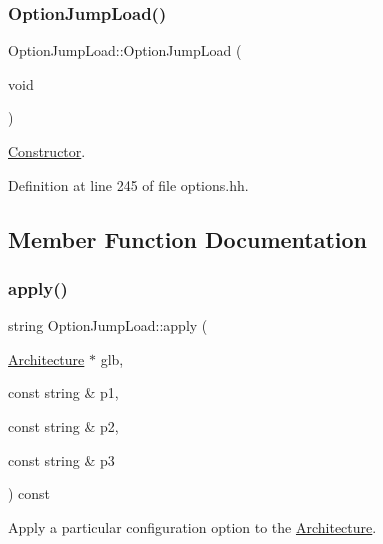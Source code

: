 \subsubsection{\texorpdfstring{OptionJumpLoad()}{OptionJumpLoad()}}
{\footnotesize\ttfamily Option\+Jump\+Load\+::\+Option\+Jump\+Load (\begin{DoxyParamCaption}\item[{void}]{ }\end{DoxyParamCaption})\hspace{0.3cm}{\ttfamily [inline]}}



\mbox{\hyperlink{class_constructor}{Constructor}}. 



Definition at line 245 of file options.\+hh.



\subsection{Member Function Documentation}
\mbox{\label{class_option_jump_load_a7b290bad24d6dd14d77a04c5688300e6}} 
\subsubsection{\texorpdfstring{apply()}{apply()}}
{\footnotesize\ttfamily string Option\+Jump\+Load\+::apply (\begin{DoxyParamCaption}\item[{\mbox{\hyperlink{class_architecture}{Architecture}} $\ast$}]{glb,  }\item[{const string \&}]{p1,  }\item[{const string \&}]{p2,  }\item[{const string \&}]{p3 }\end{DoxyParamCaption}) const\hspace{0.3cm}{\ttfamily [virtual]}}



Apply a particular configuration option to the \mbox{\hyperlink{class_architecture}{Architecture}}. 


